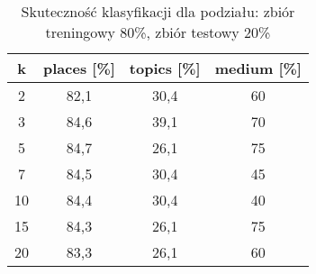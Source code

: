 \documentclass{classrep}
\begin{document}
\begin{table}[H]
	\centering
	\begin{tabular}{c c c c} 
		\hline
		\textbf{k} & \textbf{places [\%]} & \textbf{topics [\%]} &  \textbf{medium [\%]} \\ [0.5ex] 
		\hline
		\hline 
2 & 82,1 & 30,4 & 60 \\ 
3 & 84,6 & 39,1 & 70 \\ 
5 & 84,7 & 26,1 & 75 \\ 
7 & 84,5 & 30,4 & 45 \\ 
10 & 84,4 & 30,4 & 40 \\ 
15 & 84,3 & 26,1 & 75 \\ 
20 & 83,3 & 26,1 & 60 \\ 
		\hline
	\end{tabular}
	\caption{Skuteczność klasyfikacji dla podziału: zbiór treningowy 80\%, zbiór testowy 20\%}
\end{table}
\end{document}
